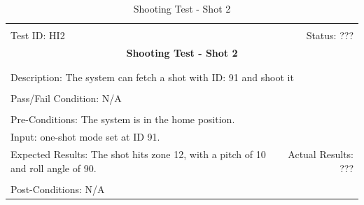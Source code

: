 \documentclass[11pt]{article}
\begin{document}
\begin{center}
\begin{table}[H]
\begin{tabular}{|l r|}\hline&\\[-2mm]
	Test ID: HI2	&Status: ???\\[-3mm]
	\multicolumn{2}{|c|}{\textbf{\large{Shooting Test - Shot 2}}}\\&\\\hline&\\[-3mm]
	\multicolumn{2}{|p{\textwidth}|}{Description: The system can fetch a shot with ID: 91 and shoot it}\\[1mm]\hline&\\[-3mm]
	\multicolumn{2}{|p{\textwidth}|}{Pass/Fail Condition: N/A}\\[1mm]\hline&\\[-3mm]
	\multicolumn{2}{|p{\textwidth}|}{Pre-Conditions: The system is in the home position.}\\[4mm]
	\multicolumn{2}{|p{\textwidth}|}{Input: one-shot mode set at ID 91.}\\[2mm]\hline
	\multicolumn{1}{|p{0.49\textwidth}}{Expected Results: The shot hits zone 12, with a pitch of 10 and roll angle of 90.}	&\multicolumn{1}{|p{0.45\textwidth}|}{Actual Results: ???}\\\hline&\\[-3mm]
	\multicolumn{2}{|p{\textwidth}|}{Post-Conditions: N/A}\\\hline
\end{tabular}
\caption{Shooting Test - Shot 2}
\end{table}
\end{center}
\end{document}
